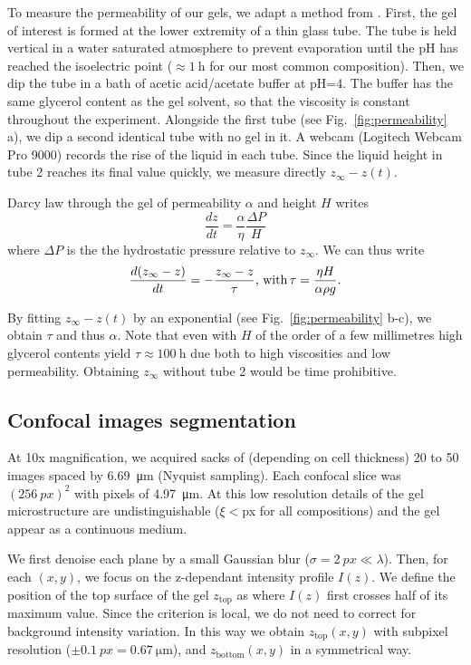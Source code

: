 \documentclass[twocolumn,superscriptaddress,showpacs,preprintnumbers,amsmath,amssymb,prl]{revtex4-1}
\begin{document}
To measure the permeability of our gels, we adapt a method from \cite{VanDijk1986}. First, the gel of interest is formed at the lower extremity of a thin glass tube. The tube is held vertical in a water saturated atmosphere to prevent evaporation until the pH has reached the isoelectric point ($\approx\SI{1}{\hour}$ for our most common composition). Then, we dip the tube in a bath of acetic acid/acetate buffer at pH=4. The buffer has the same glycerol content as the gel solvent, so that the viscosity is constant throughout the experiment. Alongside the first tube (see Fig.~\ref{fig:permeability} a), we dip a second identical tube with no gel in it. A webcam (Logitech Webcam Pro 9000) records the rise of the liquid in each tube. Since the liquid height in tube 2 reaches its final value quickly, we measure directly $z_\infty-z(t)$.

Darcy law through the gel of permeability $\alpha$ and height $H$ writes
\begin{equation}
\frac{dz}{dt} = \frac{\alpha}{\eta}\frac{\Delta P}{H}
\end{equation}
where $\Delta P$ is the the hydrostatic pressure relative to $z_\infty$. We can thus write
\begin{equation}
\frac{d(z_\infty-z)}{dt} = -\frac{z_\infty-z}{\tau}\text{, with\,} \tau = \frac{\eta H}{\alpha \rho g}.
\end{equation}

By fitting $z_\infty-z(t)$ by an exponential (see Fig.~\ref{fig:permeability} b-c), we obtain $\tau$ and thus $\alpha$. Note that even with $H$ of the order of a few millimetres high glycerol contents yield $\tau\approx \SI{100}{\hour}$ due both to high viscosities and low permeability. Obtaining $z_\infty$ without tube 2 would be time prohibitive.

\subsection*{Confocal images segmentation}

At 10x magnification, we acquired sacks of (depending on cell thickness) 20 to 50 images spaced by \SI{6.69}{\micro\metre} (Nyquist sampling). Each confocal slice was $(\SI{256}{px})^2$ with pixels of \SI{4.97}{\micro\metre}. At this low resolution details of the gel microstructure are undistinguishable ($\xi<$px for all compositions) and the gel appear as a continuous medium.

We first denoise each plane by a small Gaussian blur ($\sigma=\SI{2}{px}\ll\lambda$). Then, for each $(x,y)$, we focus on the z-dependant intensity profile $I(z)$. We define the position of the top surface of the gel $z_\text{top}$ as where $I(z)$ first crosses half of its maximum value. Since the criterion is local, we do not need to correct for background intensity variation. In this way we obtain $z_\text{top}(x,y)$ with subpixel resolution ($\pm\SI{0.1}{px}=\SI{0.67}{\micro\metre}$), and $z_\text{bottom}(x,y)$ in a symmetrical way.
\end{document}
